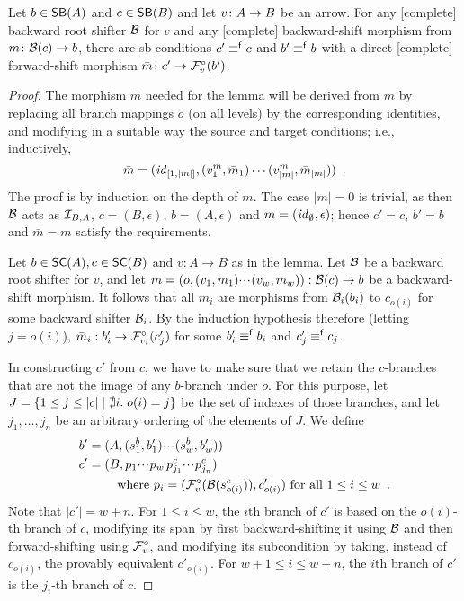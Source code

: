 \begin{lemma}
Let $b\in \SB A$ and $c\in \SB B$ and let $v\colon A\rightarrow B$ be an arrow. For any [complete] backward root shifter $\mathcal{B}$ for $v$ and any [complete] backward-shift morphism from $m\colon \mathcal{B}(c)\rightarrow b$, there are sb-conditions  $c'\equiv^{\mathsf f} c$ and $b'\equiv^{\mathsf f} b$ with a direct [complete] forward-shift morphism $\bar m\colon c' \rightarrow \mathcal{F}^\circ_{v}(b')$.
\end{lemma}
%
\begin{proof}
The morphism $\bar m$ needed for the lemma will be derived from $m$ by replacing all branch mappings $o$ (on all levels) by the corresponding identities, and modifying in a suitable way the source and target conditions; i.e., inductively,
\[ \bar m=(\mathit{id}_{[1,|m|]},(v^m_1,\bar m_1)\cdots (v^m_{|m|},\bar m_{|m|})) \enspace. \]
The proof is by induction on the depth of $m$. The case $|m|=0$ is trivial, as then $\mathcal{B}$ acts as $\mathcal{I}_{B,A}$,  $c=(B,\epsilon)$, $b=(A,\epsilon)$ and $m=(\mathit{id}_\emptyset,\epsilon)$; hence  $c'=c$, $b'=b$ and $\bar m=m$ satisfy the requirements.

\smallskip
Let $b\in \SC A,c\in \SC B$ and $v:A\to B$ as in the lemma. Let $\mathcal{B}$ be a backward root shifter for $v$, and let $m=(o,(v_1,m_1){\cdotp\mkern-2mu\cdotp\mkern-2mu\cdotp\mkern1mu}(v_w,m_w)):  \mathcal{B}(c) \rightarrow b$ be a backward-shift morphism. It follows that all $m_i$ are morphisms from $\mathcal{B}_i(b_i)$ to $c_{o(i)}$ for some backward shifter $\mathcal{B}_i$. By the induction hypothesis therefore (letting $j=o(i)$), $\bar m_i: b_i' \rightarrow \mathcal{F}^\circ_{v_i}(c_j')$ for some $b'_i\equiv^{\mathsf f} b_i$ and $c_j'\equiv^{\mathsf f} c_j$.

\smallskip
In constructing $c'$ from $c$, we have to make sure that we retain the $c$-branches that are not the image of any $b$-branch under $o$. For this purpose, let $J=\{{1\leq j\leq |c|\mid \nexists i.\; o(i)=j}\}$ be the set of indexes of those branches, and let $j_1,\ldots,j_n$ be an arbitrary ordering of the elements of $J$. We define 
\begin{align*}
b'=\;&(A,(s^b_1,b'_1){\cdotp\mkern-2mu\cdotp\mkern-2mu\cdotp\mkern1mu} (s^b_w,b'_w)) \\
c'=\;&(B,p_1{\cdotp\mkern-2mu\cdotp\mkern-2mu\cdotp\mkern1mu} p_w\,p^c_{j_1}{\cdotp\mkern-2mu\cdotp\mkern-2mu\cdotp\mkern1mu} p^c_{j_n}) \\
   & \quad\text{where } p_i = (\mathcal{F}^\circ_{v}(\mathcal{B}(s^c_{o(i)})),c'_{o(i)}) \text{ for all $1\leq i\leq w$}\enspace.
\end{align*}
%
Note that $|c'|=w+n$. For $1\leq i\leq w$, the $i$th branch of $c'$ is based on the $o(i)$-th branch of $c$, modifying its span by first backward-shifting it using $\mathcal{B}$ and then forward-shifting using $\mathcal{F}^\circ_{v}$, and modifying its subcondition by taking, instead of $c_{o(i)}$, the provably equivalent $c'_{o(i)}$. For $w+1\leq i\leq w+n$, the $i$th branch of $c'$ is the $j_i$-th branch of $c$.


\end{proof}
